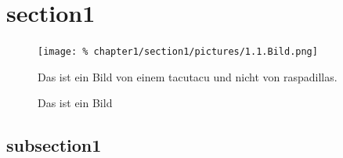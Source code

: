 \section{section1}\label{sec:section1}
	\lipsum[2]
	
	\newpage
		
	\begin{figure}[h]
		\centering
		\texttt{[image: \%
			chapter1/section1/pictures/1.1.Bild.png]}
		\caption[Bild]{Das ist ein Bild von einem \Gls{tacutacu} %
		               und nicht von \Glspl{raspadilla}.}
		\label{pic:Bild}
	\end{figure} %
	
	\begin{figure}[h]
		\centering
		\scalebox{0.8}{}
		\caption[Plot]{Das ist ein Bild}
		\label{pic:Plot}
	\end{figure}
	
	\subsection{subsection1}
		\lipsum[3]
		
